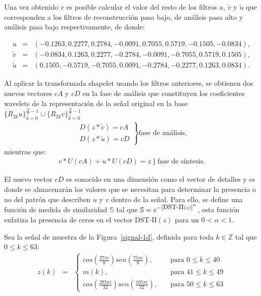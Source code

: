 \par Una vez obtenido $v$ es posible calcular el valor del resto de los filtros $u$, $\tilde{v}$ y $\tilde{u}$ que corresponden a los filtros de reconstrucci\'on pasa bajo, de an\'alisis pasa alto y an\'alisis pasa bajo respectivamente, de donde:

\begin{eqnarray}
u&=&(-0.1263,0.2277,0.2784,-0.0091,0.7055,0.5719,-0.1505,-0.0834),\nonumber\\
\tilde{v}&=&(-0.0834,0.1263,0.2277,-0.2784,-0.0091,-0.7055,0.5719,0.1505),\nonumber\\
\tilde{u}&=&(0.1505,-0.5719,-0.7055,0.0091,-0.2784,-0.2277,0.1263,0.0834).\nonumber
\end{eqnarray}

\par Al aplicar la transformada shapelet usando los filtros anteriores, se obtienen dos nuevos vectores $cA$ y $cD$ en la fase de an\'alisis que constituyen los coeficientes wavelets de la representaci\'on de la se\~nal original en la base $\{R_{2k}u\}_{k=0}^{\frac{N}{2}-1} \cup \{R_{2k}v\}_{k=0}^{\frac{N}{2}-1}$
\begin{eqnarray}
\left.\begin{array}{r}
D(z\ast\tilde{v})=cA\\
D(z\ast\tilde{u})=cD
\end{array}\right\}\mbox{fase de an\'alisis,}\nonumber
\end{eqnarray}
mientras que:
\begin{eqnarray}
\left.v\ast U(cA)+u\ast U(cD)=z\right\}\mbox{fase de s\'intesis.}\nonumber
\end{eqnarray}

\par El nuevo vector $cD$ es conocido en una dimensi\'on como el vector de detalles y es donde se almacenar\'an los valores que se necesitan para determinar la presencia o no del patr\'on que describen $u$ y $v$ dentro de la se\~nal. Para ello, se define una funci\'on de medida de similaridad $\mathbb{S}$ tal que $\mathbb{S}=e^{-\left|\mbox{\small{DST-II}}(z)\right|^{\alpha}}$, esta funci\'on enfatiza la presencia de ceros en el vector $\mbox{DST-II}(z)$ para un $0<\alpha<1$.

\par Sea la se\~nal de muestra de la Figura~\ref{signal-1d}, definida para toda $k\in \mathbb{Z}$ tal que $0\leq k \leq 63$:
\begin{eqnarray}
z(k)&=&\left\{\begin{array}{ll}
cos\left(\frac{27\pi i}{8}\right)sen\left(\frac{75\pi i}{8}\right),&\quad\mbox{para $0\leq k \leq 40$}\\
m(k),&\quad\mbox{para $41 \leq k \leq 49$}\\
cos\left(\frac{295\pi i}{32}\right)sen\left(\frac{105\pi i}{32}\right),&\quad\mbox{para $50 \leq k \leq 63$}
\end{array}\right.\nonumber
\end{eqnarray}

